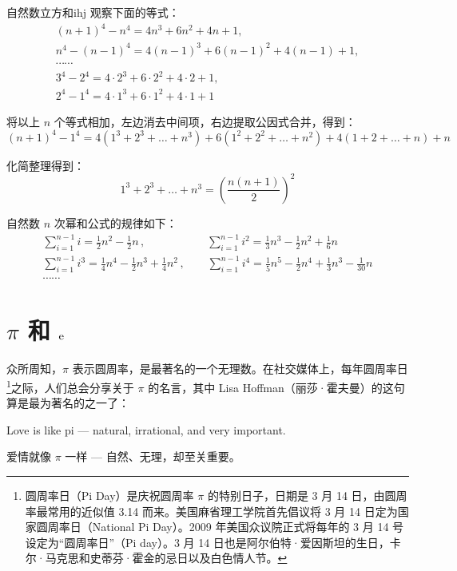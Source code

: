 \documentclass[12pt, cn]{elegantart}
\begin{document}
\begin{definition}{自然数立方和}{ihj}
	观察下面的等式：
$$\begin{array}{l}
{(n+1)^{4}-n^{4}=4 n^{3}+6 n^{2}+4 n+1}, \\ {n^{4}-(n-1)^{4}=4(n-1)^{3}+6(n-1)^{2}+4(n-1)+1}, \\ {\cdots \cdots} \\ {3^{4}-2^{4}=4 \cdot 2^{3}+6 \cdot 2^{2}+4 \cdot 2+1}, \\ {2^{4}-1^{4}=4 \cdot 1^{3}+6 \cdot 1^{2}+4 \cdot 1+1}
\end{array}$$

将以上 $n$ 个等式相加，左边消去中间项，右边提取公因式合并，得到：
$$
(n+1)^{4}-1^{4}=4\left(1^{3}+2^{3}+\dots+n^{3}\right)+6\left(1^{2}+2^{2}+\dots+n^{2}\right)+4(1+2+\dots+n)+n$$

化简整理得到：
$$
1^{3}+2^{3}+\dots+n^{3}=\left(\frac{n(n+1)}{2}\right)^{2}$$
\end{definition}

\noindent 自然数 $n$ 次幂和公式的规律如下：
$$
\begin{array}{l}
{\sum_{i=1}^{n-1} i=\frac{1}{2} n^{2}-\frac{1}{2} n}\,, \quad\quad\quad\quad\quad\;\ {\sum_{i=1}^{n-1} i^{2}=\frac{1}{3} n^{3}-\frac{1}{2} n^{2}+\frac{1}{6} n} \\[15pt] {\sum_{i=1}^{n-1} i^{3}=\frac{1}{4} n^{4}-\frac{1}{2} n^{3}+\frac{1}{4} n^{2}}\,, \quad\quad {\sum_{i=1}^{n-1} i^{4}=\frac{1}{5} n^{5}-\frac{1}{2} n^{4}+\frac{1}{3} n^{3}-\frac{1}{30} n} \\ \cdots\cdots
\end{array}
$$

\section{$\pi$ 和 $\mathrm{e}$}

众所周知，$\pi$ 表示圆周率，是最著名的一个无理数。在社交媒体上，每年圆周率日\footnote{圆周率日（Pi Day）是庆祝圆周率 $\pi$ 的特别日子，日期是 3 月 14 日，由圆周率最常用的近似值 3.14 而来。美国麻省理工学院首先倡议将 3 月 14 日定为国家圆周率日（National Pi Day）。2009 年美国众议院正式将每年的 3 月 14 号设定为“圆周率日”（Pi day）。3 月 14 日也是阿尔伯特·爱因斯坦的生日，卡尔·马克思和史蒂芬·霍金的忌日以及白色情人节。}之际，人们总会分享关于 $\pi$ 的名言，其中 Lisa Hoffman（丽莎·霍夫曼）的这句算是最为著名的之一了：
\vspace{5pt}

\begin{tcolorbox}[saying]
Love is like pi --- natural, irrational, and very important.
\vspace{5pt}

爱情就像 $\pi$ 一样 --- 自然、无理，却至关重要。
\end{tcolorbox}
\end{document}
